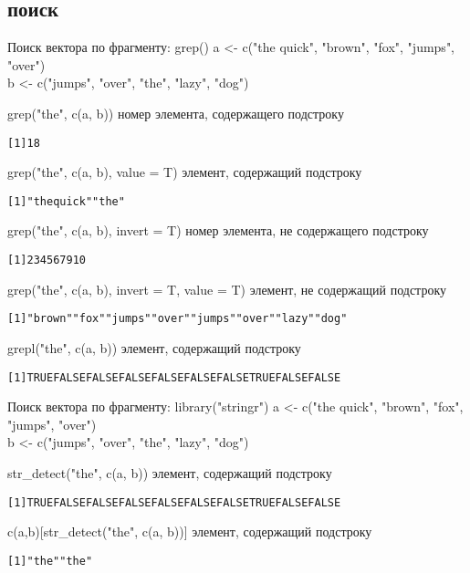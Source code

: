 \subsection{поиск}
\begin{frame}[fragile]{Поиск вектора по фрагменту: grep()}
a <- c("the quick"{}, "brown"{}, "fox"{}, "jumps"{}, "over"{})\\
b <- c("jumps"{}, "over"{}, "the"{}, "lazy"{}, "dog"{})
\begin{itemize}
\vfill
\mytem grep("the"{}, c(a, b)) \hfill номер элемента, содержащего подстроку
\footnotesize
\begin{alltt}
[1] 1 8
\end{alltt}
\normalsize
\vfill
\mytem grep("the"{}, c(a, b), value = T) \hfill элемент, содержащий подстроку
\footnotesize
\begin{alltt}
[1] "the quick" "the"
\end{alltt}
\normalsize
\vfill
\mytem grep("the"{}, c(a, b), invert = T) \hfill номер элемента, не содержащего подстроку
\footnotesize
\begin{alltt}
[1]  2  3  4  5  6  7  9 10
\end{alltt}
\normalsize
\vfill
\mytem grep("the"{}, c(a, b), invert = T, value = T) \hfill элемент, не содержащий подстроку
\footnotesize
\begin{alltt}
[1] "brown" "fox"   "jumps" "over"  "jumps" "over"  "lazy"  "dog"
\end{alltt}
\normalsize
\vfill
\mytem grepl("the"{}, c(a, b)) \hfill элемент, содержащий подстроку
\scriptsize
\begin{alltt}
[1] TRUE FALSE FALSE FALSE FALSE FALSE FALSE  TRUE FALSE FALSE
\end{alltt}
\normalsize
\end{itemize}
\end{frame}
\begin{frame}[fragile]{Поиск вектора по фрагменту: library("stringr")}
a <- c("the quick"{}, "brown"{}, "fox"{}, "jumps"{}, "over"{})\\
b <- c("jumps"{}, "over"{}, "the"{}, "lazy"{}, "dog"{})
\begin{itemize}
\mytem str\_detect("the"{}, c(a, b)) \hfill элемент, содержащий подстроку
\scriptsize
\begin{alltt}
[1] TRUE FALSE FALSE FALSE FALSE FALSE FALSE  TRUE FALSE FALSE
\end{alltt}
\normalsize
\mytem c(a,b)[str\_detect("the"{}, c(a, b))] \hfill элемент, содержащий подстроку
\scriptsize
\begin{alltt}
[1] "the" "the"
\end{alltt}
\normalsize
\end{itemize}
\end{frame}
